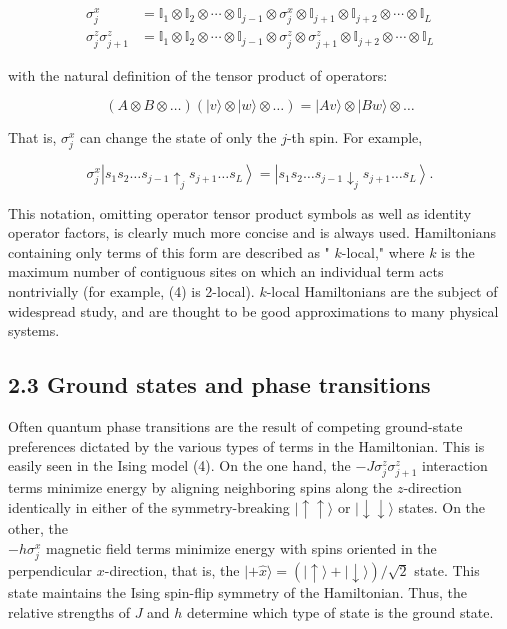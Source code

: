 \documentclass[10pt]{article}
\begin{document}
\begin{align*}
\sigma_{j}^{x} & =\mathbb{I}_{1} \otimes \mathbb{I}_{2} \otimes \cdots \otimes \mathbb{I}_{j-1} \otimes \sigma_{j}^{x} \otimes \mathbb{I}_{j+1} \otimes \mathbb{I}_{j+2} \otimes \cdots \otimes \mathbb{I}_{L}  \tag{5}\\
\sigma_{j}^{z} \sigma_{j+1}^{z} & =\mathbb{I}_{1} \otimes \mathbb{I}_{2} \otimes \cdots \otimes \mathbb{I}_{j-1} \otimes \sigma_{j}^{z} \otimes \sigma_{j+1}^{z} \otimes \mathbb{I}_{j+2} \otimes \cdots \otimes \mathbb{I}_{L} \tag{6}
\end{align*}


with the natural definition of the tensor product of operators:


\begin{equation*}
(A \otimes B \otimes \ldots)(|v\rangle \otimes|w\rangle \otimes \ldots)=|A v\rangle \otimes|B w\rangle \otimes \ldots \tag{7}
\end{equation*}


That is, $\sigma_{j}^{x}$ can change the state of only the $j$-th spin. For example,


\begin{equation*}
\sigma_{j}^{x}\left|s_{1} s_{2} \ldots s_{j-1} \uparrow_{j} s_{j+1} \ldots s_{L}\right\rangle=\left|s_{1} s_{2} \ldots s_{j-1} \downarrow_{j} s_{j+1} \ldots s_{L}\right\rangle . \tag{8}
\end{equation*}


This notation, omitting operator tensor product symbols as well as identity operator factors, is clearly much more concise and is always used. Hamiltonians containing only terms of this form are described as " $k$-local," where $k$ is the maximum number of contiguous sites on which an individual term acts nontrivially (for example, (4) is 2-local). $k$-local Hamiltonians are the subject of widespread study, and are thought to be good approximations to many physical systems.

\subsection*{2.3 Ground states and phase transitions}
Often quantum phase transitions are the result of competing ground-state preferences dictated by the various types of terms in the Hamiltonian. This is easily seen in the Ising model (4). On the one hand, the $-J \sigma_{j}^{z} \sigma_{j+1}^{z}$ interaction terms minimize energy by aligning neighboring spins along the $z$-direction identically in either of the symmetry-breaking $|\uparrow \uparrow\rangle$ or $|\downarrow \downarrow\rangle$ states. On the other, the\\
$-h \sigma_{j}^{x}$ magnetic field terms minimize energy with spins oriented in the perpendicular $x$-direction, that is, the $|+\hat{x}\rangle=(|\uparrow\rangle+|\downarrow\rangle) / \sqrt{2}$ state. This state maintains the Ising spin-flip symmetry of the Hamiltonian. Thus, the relative strengths of $J$ and $h$ determine which type of state is the ground state.
\end{document}
